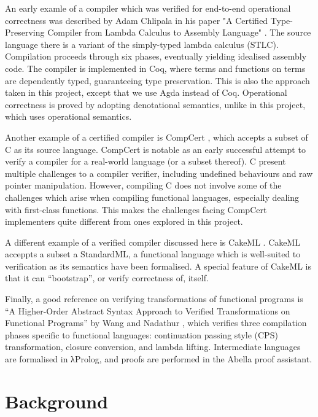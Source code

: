 \documentclass[bsc,frontabs,oneside,singlespacing,parskip,deptreport]{infthesis}
\theoremstyle{definition}
\theoremstyle{lemma}
\begin{document}
An early examle of a compiler which was verified for end-to-end
operational correctness was described by Adam Chlipala in his paper "A
Certified Type-Preserving Compiler from Lambda Calculus to Assembly
Language" \cite{DBLP:conf/pldi/Chlipala07}. The source language there
is a variant of the simply-typed lambda calculus (STLC). Compilation
proceeds through six phases, eventually yielding idealised assembly
code. The compiler is implemented in Coq, where terms and functions on
terms are dependently typed, guaranteeing type preservation. This is
also the approach taken in this project, except that we use Agda
instead of Coq. Operational correctness is proved by adopting
denotational semantics, unlike in this project, which uses operational
semantics.

Another example of a certified compiler is CompCert
\cite{DBLP:conf/popl/Leroy06}, which accepts a subset of C as its
source language. CompCert is notable as an early successful attempt to
verify a compiler for a real-world language (or a subset thereof). C
present multiple challenges to a compiler verifier, including
undefined behaviours and raw pointer manipulation. However, compiling
C does not involve some of the challenges which arise when compiling
functional languages, especially dealing with first-class
functions. This makes the challenges facing CompCert implementers
quite different from ones explored in this project.

A different example of a verified compiler discussed here is CakeML
\cite{POPL14}. CakeML acceppts a subset a StandardML, a functional
language which is well-suited to verification as its semantics have
been formalised. A special feature of CakeML is that it can
``bootstrap'', or verify correctness of, itself.

Finally, a good reference on verifying transformations of functional
programs is ``A Higher-Order Abstract Syntax Approach to Verified
Transformations on Functional Programs'' by Wang and Nadathur
\cite{DBLP:conf/esop/WangN16}, which verifies three compilation phases
specific to functional languages: continuation passing style (CPS)
transformation, closure conversion, and lambda lifting. Intermediate
languages are formalised in λProlog, and proofs are performed in the
Abella proof assistant.

\chapter{Background}
\label{cha:background}
\end{document}
